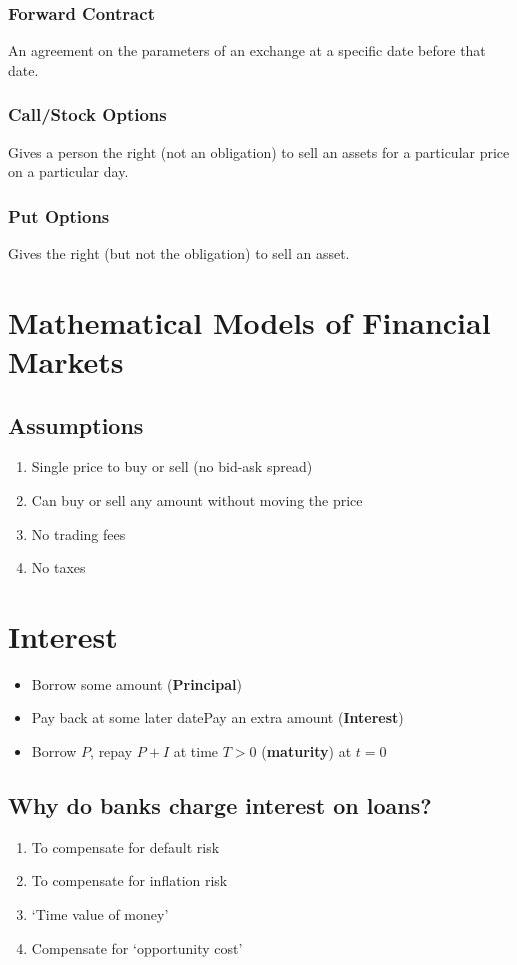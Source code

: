 \documentclass[12pt,letterpaper, twocolumn]{article}
\begin{document}
\subsubsection*{Forward Contract}
An agreement on the parameters of an exchange at a specific date before that date. 
\subsubsection*{Call/Stock Options}
Gives a person the right (not an obligation) to sell an assets for a particular price on a particular day. 
\subsubsection*{Put Options}
Gives the right (but not the obligation) to sell an asset. 

\section{Mathematical Models of Financial Markets}
\subsection*{Assumptions}
\begin{enumerate}
    \item Single price to buy or sell (no bid-ask spread)
    \item Can buy or sell any amount without moving the price
    \item No trading fees
    \item No taxes
\end{enumerate} 

\section{Interest}
\begin{itemize}
\item Borrow some amount (\textbf{Principal})
\item Pay back at some later datePay an extra amount (\textbf{Interest})
\item Borrow $P$, repay $P+I$ at time $T>0$ (\textbf{maturity}) at $t=0$
\end{itemize}
\subsection*{Why do banks charge interest on loans? }
\begin{enumerate}
    \item To compensate for default risk
    \item To compensate for inflation risk
    \item `Time value of money'
    \item Compensate for `opportunity cost'
\end{enumerate}
\end{document}
